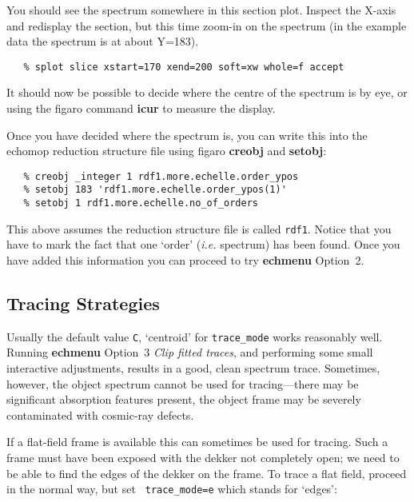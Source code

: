 \documentclass[twoside,11pt]{article}
\newcommand{\htmlref}[2]{#1}
\newcommand{\xref}[3]{#1}
\newcommand{\xlabel}[1]{}
\newcommand{\mlabel}[1]{\xlabel{#1}\label{#1}}
\newcommand{\scspec}[2]{#1}
\newcommand{\scspec}[2]{#2}
\begin{document}
You should see the spectrum somewhere in this section plot.  Inspect the
X-axis and redisplay the section, but this time zoom-in on the spectrum
(in the example data the spectrum is at about Y=183).

{
\scspec{\small}{ }
\begin{verbatim}
   % splot slice xstart=170 xend=200 soft=xw whole=f accept
\end{verbatim}
}

It should now be possible to decide where the centre of the spectrum is
by eye, or using the {\sc figaro} command \xref{{\bf icur}}{sun86}{ICUR}
to measure the display.

Once you have decided where the spectrum is, you can write this into the
{\sc echomop}
\xref{reduction structure file}{sun152}{reduction_file} using {\sc figaro}
\xref{{\bf creobj}}{sun86}{CREOBJ} and
\xref{{\bf setobj}}{sun86}{SETOBJ}:

{
\scspec{\small}{ }
\begin{verbatim}
   % creobj _integer 1 rdf1.more.echelle.order_ypos
   % setobj 183 'rdf1.more.echelle.order_ypos(1)'
   % setobj 1 rdf1.more.echelle.no_of_orders
\end{verbatim}
}

This above assumes the reduction structure file is called \verb+rdf1+\@.
Notice that you have to mark the fact that one `order' ({\it{i.e.}} spectrum)
has been found.  Once you have added this information you can proceed to
try \xref{{\bf echmenu} Option~2}{sun152}{option2}\@.


\subsection{\mlabel{cook_tracing}Tracing Strategies}

Usually the default value {\tt C}, `centroid' for 
\xref{{\tt trace\_mode}}{sun152}{par_TRACE_MODE} works reasonably
well. Running \xref{{\bf echmenu}}{sun152}{ECHMENU} \xref{Option~3
{\sl Clip fitted traces}}{sun152}{option3}, and performing some small
interactive adjustments, results in a good, clean spectrum trace.
Sometimes, however, the object spectrum cannot be used for
tracing\scspec{---}{ - }there may be significant absorption features
present, the object frame may be severely contaminated with cosmic-ray
defects.

If a flat-field frame is available this can sometimes be used for tracing.
Such a frame must have been exposed with the \htmlref{dekker}{gl_dekker}
not completely open;
we need to be able to find the edges of the dekker on the frame.
To trace a flat field, proceed in the normal way, but set \xref{{\tt
trace\_mode=e}}{sun152}{par_TRACE_MODE} which stands for `edges':
\end{document}
